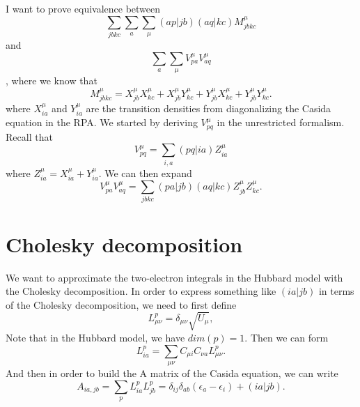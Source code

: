 \documentclass[12pt]{article}
\begin{document}
\section{}
I want to prove equivalence between $$\sum_{jbkc} \sum_{a} \sum_{\mu } (ap|jb)(aq|kc)M_{jbkc}^{\mu}$$ and $$\sum_{a} \sum_{\mu } V_{pa}^{\mu }V_{aq}^{\mu }$$, where we know that
\begin{equation}
    M_{jbkc}^{\mu} = X_{jb}^{\mu}X_{kc}^{\mu} + X_{jb}^{\mu}Y_{kc}^{\mu} + Y_{jb}^{\mu}X_{kc}^{\mu} + Y_{jb}^{\mu}Y_{kc}^{\mu}.
\end{equation}
where \( X_{ia}^{\mu} \) and \( Y_{ia}^{\mu} \) are the transition densities from diagonalizing the Casida equation in the RPA.
We started by deriving \( V_{pq}^{\mu} \) in the unrestricted formalism. Recall that
\begin{equation}
    V_{pq}^{\mu} = \sum _{i,a}(pq|ia) Z_{ia}^{\mu}
\end{equation}
where \( Z_{ia}^{\mu} = X_{ia}^{\mu} + Y_{ia}^{\mu} \). We can then expand
\begin{equation}
    V_{pa}^{\mu}V_{aq}^{\mu} = \sum _{jbkc} (pa|jb)(aq|kc)Z_{jb}^{\mu}Z_{kc}^{\mu}.
\end{equation}
\section{Cholesky decomposition}
We want to approximate the two-electron integrals in the Hubbard model with the Cholesky decomposition. In order to express something like $(ia|jb)$ in terms of the Cholesky decomposition, we need to first define
\begin{equation}
    L_{\mu \nu}^p = \delta _{\mu \nu} \sqrt{U_{\mu}},
\end{equation}
Note that in the Hubbard model, we have $dim(p)=1$. Then we can form
\begin{equation}
    L_{ia}^p = \sum _{\mu \nu} C_{\mu i} C_{\nu a} L_{\mu \nu}^p.
\end{equation}
And then in order to build the A matrix of the Casida equation, we can write
\begin{equation}
    A_{ia,jb} = \sum _{p} L_{ia}^p L_{jb}^p = \delta _{ij}\delta _{ab}\left( \epsilon _a - \epsilon _i \right) + (ia|jb).
\end{equation}
\end{document}
